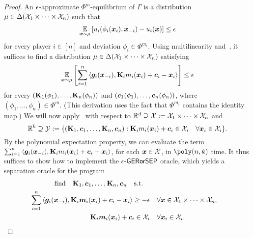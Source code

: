 \begin{proof}
An $\epsilon$-approximate $\Phi^m$-equilibrium of $\Gamma$  is a distribution $\mu \in \Delta({\mathcal{X}}_1 \times \dots \times {\mathcal{X}}_n)$ such that
\begin{align}
\operatorname*{\mathbb E}_{{\bm{x}} \sim \mu} \qty[u_i(\phi_i({\bm{x}}_i), {\bm{x}}_{-i}) - u_i({\bm{x}})] \le \epsilon\label{eq:phi-eqm}
\end{align}
for every player $i \in [n]$ and deviation $\phi_i \in \Phi^{m_i}$. Using multilinearity and~, it suffices to find a distribution $\mu\in\Delta({\mathcal{X}}_1 \times \dots \times {\mathcal{X}}_n)$ satisfying
\begin{align}
\E_{\vx \sim \mu} \left[ \sum_{i =1}^n \ip{\vg_i(\vx_{-i}), \mK_i m_i(\vx_i) + \cons_i - \vx_i} \right] \le \eps \label{eq:phi-sp}
\end{align}
for every $({\mathbf{K}}_1(\phi_1), \dots, {\mathbf{K}}_n(\phi_n))$ and $(\bm{c}_1(\phi_1), \dots, \bm{c}_n(\phi_n))$, where $(\phi_1, \dots, \phi_n) \in \Phi^{m}$. (This derivation uses the fact that $\Phi^{m_i}$ contains the identity map.) We will now apply~ with respect to $\mathbb R^d \supseteq {\mathcal{X}} := {\mathcal{X}}_1 \times \dots \times {\mathcal{X}}_n$ and 
$$\mathbb R^{k} \supseteq {\mathcal{Y}} := \{ ({\mathbf{K}}_1, \bm{c}_1, \dots, {\mathbf{K}}_n, \bm{c}_n) : {\mathbf{K}}_i m_i({\bm{x}}_i) + \bm{c}_i \in {\mathcal{X}}_i \quad \forall {\bm{x}}_i \in {\mathcal{X}}_i \}. $$
By the polynomial expectation property, we can evaluate the term $\sum_{i =1}^n \ip{\vg_i(\vx_{-i}), \mK_i m_i(\vx_i) + \cons_i - \vx_i}$, for each ${\bm{x}} \in {\mathcal{X}}$, in $\poly(n, k)$ time. It thus suffices to show how to implement the $\epsilon$-$\textsf{GERorSEP}$ oracle, which yields a separation oracle for the program
\begin{alignat}{9}
\qq{find} \mK_1, \cons_1, \dots, \mK_n, \cons_n \qq{s.t.} \\
\sum_{i =1}^n \ip{\vg_i(\vx_{-i}), \mK_i \vm_i(\vx_i) + \cons_i - \vx_i} \ge - \eps &\quad\forall \vx \in \cX_1 \times \dots \times \cX_n, \label{eq:phi-sp}
\\
\mK_i \vm_i(\vx_i) + \cons_i \in \cX_i &\quad \forall\vx_i \in \cX_i.
\end{alignat}


\end{proof}
